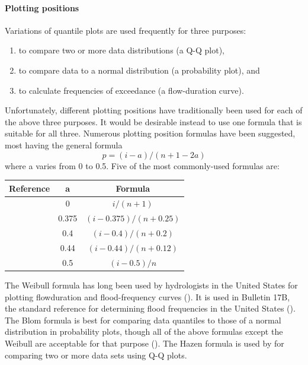 \documentclass[]{book}
\providecommand{\tightlist}{%
  \setlength{\itemsep}{0pt}\setlength{\parskip}{0pt}}
\let\oldparagraph\paragraph
\renewcommand{\paragraph}[1]{\oldparagraph{#1}\mbox{}}
\begin{document}
\hypertarget{plotting-positions}{%
\paragraph{Plotting positions}\label{plotting-positions}}

Variations of quantile plots are used frequently for three purposes:

\begin{enumerate}
\def\labelenumi{\arabic{enumi}.}
\tightlist
\item
  to compare two or more data distributions (a Q-Q plot),
\item
  to compare data to a normal distribution (a probability plot), and
\item
  to calculate frequencies of exceedance (a flow-duration curve).
\end{enumerate}

Unfortunately, different plotting positions have traditionally been used for each of the above three purposes. It would be desirable instead to use one formula that is suitable for all three. Numerous plotting position formulas have been suggested, most having the general formula \[p = (i − a) / (n + 1 − 2a)\] where a varies from 0 to 0.5. Five of the most commonly-used formulas are:

\begin{longtable}[]{@{}ccc@{}}
\toprule
Reference & a & Formula\tabularnewline
\midrule
\endhead
\citet{weibull_phenomenon_1939} & 0 & \(i / (n + 1)\)\tabularnewline
\citet{blom_statistical_1958} & 0.375 & \((i - 0.375) / (n + 0.25)\)\tabularnewline
\citet{cunnane_unbiased_1978} & 0.4 & \((i - 0.4) / (n + 0.2)\)\tabularnewline
\citet{gringorten_plotting_1963} & 0.44 & \((i - 0.44) / (n + 0.12)\)\tabularnewline
\citet{hazen_storage_1914} & 0.5 & \((i - 0.5) / n\)\tabularnewline
\bottomrule
\end{longtable}

The Weibull formula has long been used by hydrologists in the United States for plotting flowduration and flood-frequency curves (\citet{langbein_plotting_1960}). It is used in Bulletin 17B, the standard reference for determining flood frequencies in the United States (\citet{interagency_guidelines_1982}). The Blom formula is best for comparing data quantiles to those of a normal distribution in probability plots, though all of the above formulas except the Weibull are acceptable for that purpose (\citet{looney_probability_1985}). The Hazen formula is used by \citet{chambers_graphical_1983} for comparing two or more data sets using Q-Q plots.
\end{document}
